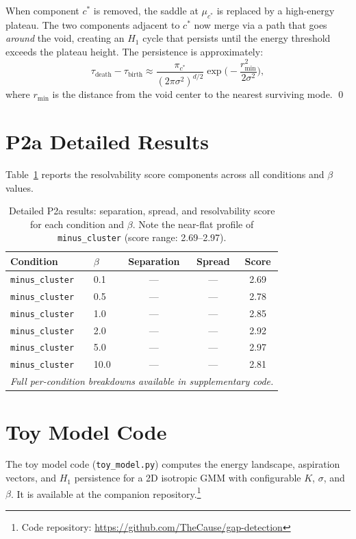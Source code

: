 \documentclass[11pt]{article}
\begin{document}
When component $c^*$ is removed, the saddle at $\mu_{c^*}$ is replaced by
a high-energy plateau.
The two components adjacent to $c^*$ now merge via a path that goes
\emph{around} the void, creating an $H_1$ cycle that persists until the
energy threshold exceeds the plateau height.
The persistence is approximately:
\[
\tau_{\text{death}} - \tau_{\text{birth}} \approx
  \frac{\pi_{c^*}}{(2\pi\sigma^2)^{d/2}}
  \exp\!\Big(-\frac{r_{\min}^2}{2\sigma^2}\Big),
\]
where $r_{\min}$ is the distance from the void center to the nearest
surviving mode. \qed


\section{P2a Detailed Results}
\label{app:p2a}

Table~\ref{tab:p2a_detail} reports the resolvability score components
across all conditions and $\beta$ values.

\begin{table}[h]
\centering
\caption{Detailed P2a results: separation, spread, and resolvability score
for each condition and $\beta$.
Note the near-flat profile of \texttt{minus\_cluster}
(score range: 2.69--2.97).}
\label{tab:p2a_detail}
\begin{tabular}{llccc}
\toprule
Condition & $\beta$ & Separation & Spread & Score \\
\midrule
\texttt{minus\_cluster} & 0.1  & --- & --- & 2.69 \\
\texttt{minus\_cluster} & 0.5  & --- & --- & 2.78 \\
\texttt{minus\_cluster} & 1.0  & --- & --- & 2.85 \\
\texttt{minus\_cluster} & 2.0  & --- & --- & 2.92 \\
\texttt{minus\_cluster} & 5.0  & --- & --- & 2.97 \\
\texttt{minus\_cluster} & 10.0 & --- & --- & 2.81 \\
\midrule
\multicolumn{5}{l}{\emph{Full per-condition breakdowns available in
supplementary code.}} \\
\bottomrule
\end{tabular}
\end{table}


\section{Toy Model Code}
\label{app:code}

The toy model code (\texttt{toy\_model.py}) computes the energy landscape,
aspiration vectors, and $H_1$ persistence for a 2D isotropic GMM with
configurable $K$, $\sigma$, and $\beta$.
It is available at the companion repository.\footnote{%
  Code repository: \url{https://github.com/TheCause/gap-detection}}
\end{document}
